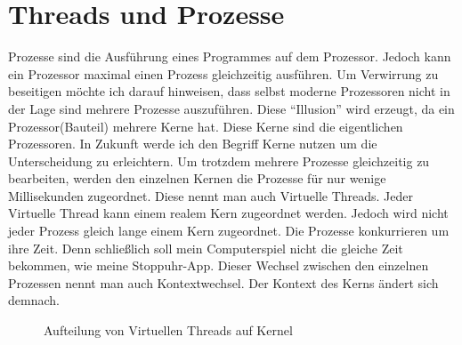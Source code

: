 \section{Threads und Prozesse}
Prozesse sind die Ausführung eines Programmes auf dem Prozessor. Jedoch kann ein Prozessor maximal einen Prozess gleichzeitig ausführen. Um Verwirrung zu beseitigen möchte ich darauf hinweisen, dass selbst moderne Prozessoren nicht in der Lage sind mehrere Prozesse auszuführen. Diese ``Illusion'' wird erzeugt, da ein Prozessor(Bauteil) mehrere Kerne hat. Diese Kerne sind die eigentlichen Prozessoren. In Zukunft werde ich den Begriff Kerne nutzen um die Unterscheidung zu erleichtern. Um trotzdem mehrere Prozesse gleichzeitig zu bearbeiten, werden den einzelnen Kernen die Prozesse für nur wenige Millisekunden zugeordnet. Diese nennt man auch Virtuelle Threads. Jeder Virtuelle Thread kann einem realem Kern zugeordnet werden. Jedoch wird nicht jeder Prozess gleich lange einem Kern zugeordnet. Die Prozesse konkurrieren um ihre Zeit. Denn schließlich soll mein Computerspiel nicht die gleiche Zeit bekommen, wie meine Stoppuhr-App. Dieser Wechsel zwischen den einzelnen Prozessen nennt man auch Kontextwechsel. Der Kontext des Kerns ändert sich demnach.

\begin{figure}[h]
    \centering
    \caption{Aufteilung von Virtuellen Threads auf Kernel}
\end{figure}

